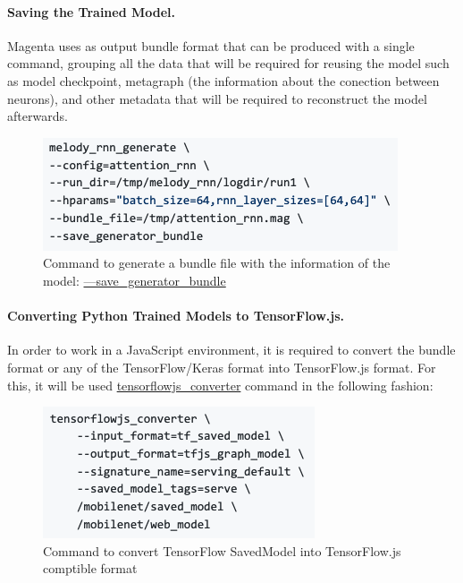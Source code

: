 \paragraph{Saving the Trained Model.} Magenta uses as output bundle format that can be
produced with a single command, grouping all the data that will be required for reusing
the model such as model checkpoint, metagraph (the information about the conection
between neurons), and other metadata that will be required to reconstruct the model
afterwards.

\begin{figure}[h!]
  \caption{Command to generate a bundle file with the information of the model: \url{—save_generator_bundle}}
  \includegraphics[width=\linewidth]{image/fig_JDF09.png}
\end{figure}

\paragraph{Converting Python Trained Models to TensorFlow.js.} In order to work in a JavaScript
environment, it is required to convert the bundle format or any of the TensorFlow/Keras
format into TensorFlow.js format. For this, it will be used \url{tensorflowjs_converter}
command in the following fashion:

\begin{figure}[h!]
  \caption{Command to convert TensorFlow SavedModel into TensorFlow.js comptible format}
  \includegraphics[width=\linewidth]{image/fig_JDF10.png}
\end{figure}

